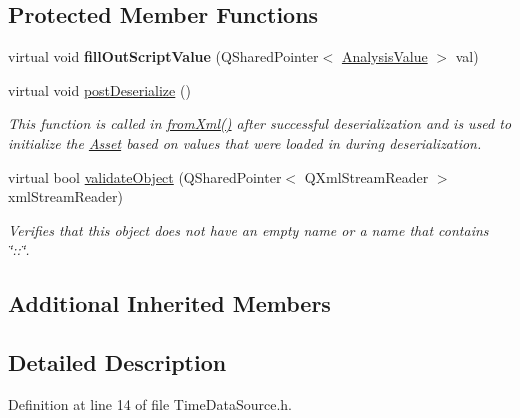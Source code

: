 \subsection*{Protected Member Functions}
\begin{DoxyCompactItemize}
\item 
\hypertarget{class_picto_1_1_time_data_source_a9e615d71f14698b78df974f13c498962}{virtual void {\bfseries fill\-Out\-Script\-Value} (Q\-Shared\-Pointer$<$ \hyperlink{struct_picto_1_1_analysis_value}{Analysis\-Value} $>$ val)}\label{class_picto_1_1_time_data_source_a9e615d71f14698b78df974f13c498962}

\item 
virtual void \hyperlink{class_picto_1_1_time_data_source_a0faac272d18e79ed02f8bd49326150a4}{post\-Deserialize} ()
\begin{DoxyCompactList}\small\item\em This function is called in \hyperlink{class_picto_1_1_asset_a8bed4da09ecb1c07ce0dab313a9aba67}{from\-Xml()} after successful deserialization and is used to initialize the \hyperlink{class_picto_1_1_asset}{Asset} based on values that were loaded in during deserialization. \end{DoxyCompactList}\item 
\hypertarget{class_picto_1_1_time_data_source_a1fdaec937912151f48aaf39410f11258}{virtual bool \hyperlink{class_picto_1_1_time_data_source_a1fdaec937912151f48aaf39410f11258}{validate\-Object} (Q\-Shared\-Pointer$<$ Q\-Xml\-Stream\-Reader $>$ xml\-Stream\-Reader)}\label{class_picto_1_1_time_data_source_a1fdaec937912151f48aaf39410f11258}

\begin{DoxyCompactList}\small\item\em Verifies that this object does not have an empty name or a name that contains \char`\"{}\-::\char`\"{}. \end{DoxyCompactList}\end{DoxyCompactItemize}
\subsection*{Additional Inherited Members}


\subsection{Detailed Description}


Definition at line 14 of file Time\-Data\-Source.\-h.



